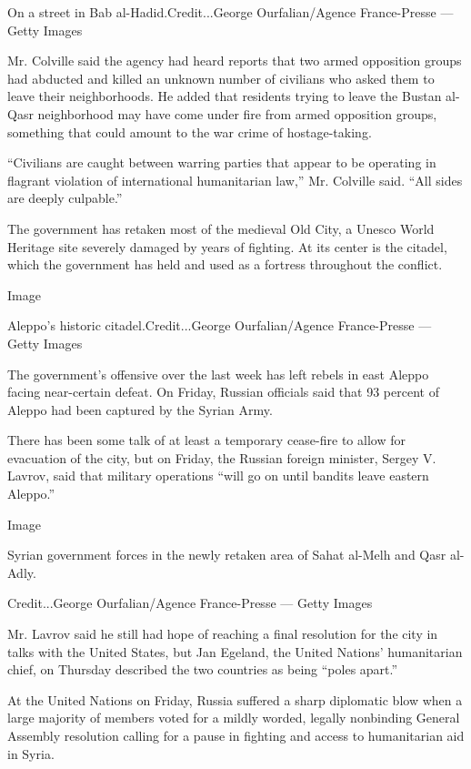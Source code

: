 On a street in Bab al-Hadid.Credit...George Ourfalian/Agence
France-Presse --- Getty Images

Mr. Colville said the agency had heard reports that two armed opposition
groups had abducted and killed an unknown number of civilians who asked
them to leave their neighborhoods. He added that residents trying to
leave the Bustan al-Qasr neighborhood may have come under fire from
armed opposition groups, something that could amount to the war crime of
hostage-taking.

``Civilians are caught between warring parties that appear to be
operating in flagrant violation of international humanitarian law,'' Mr.
Colville said. ``All sides are deeply culpable.''

The government has retaken most of the medieval Old City, a Unesco World
Heritage site severely damaged by years of fighting. At its center is
the citadel, which the government has held and used as a fortress
throughout the conflict.

Image

Aleppo's historic citadel.Credit...George Ourfalian/Agence France-Presse
--- Getty Images

The government's offensive over the last week has left rebels in east
Aleppo facing near-certain defeat. On Friday, Russian officials said
that 93 percent of Aleppo had been captured by the Syrian Army.

There has been some talk of at least a temporary cease-fire to allow for
evacuation of the city, but on Friday, the Russian foreign minister,
Sergey V. Lavrov, said that military operations ``will go on until
bandits leave eastern Aleppo.''

Image

Syrian government forces in the newly retaken area of Sahat al-Melh and
Qasr al-Adly.

Credit...George Ourfalian/Agence France-Presse --- Getty Images

Mr. Lavrov said he still had hope of reaching a final resolution for the
city in talks with the United States, but Jan Egeland, the United
Nations' humanitarian chief, on Thursday described the two countries as
being ``poles apart.''

At the United Nations on Friday, Russia suffered a sharp diplomatic blow
when a large majority of members voted for a mildly worded, legally
nonbinding General Assembly resolution calling for a pause in fighting
and access to humanitarian aid in Syria.

